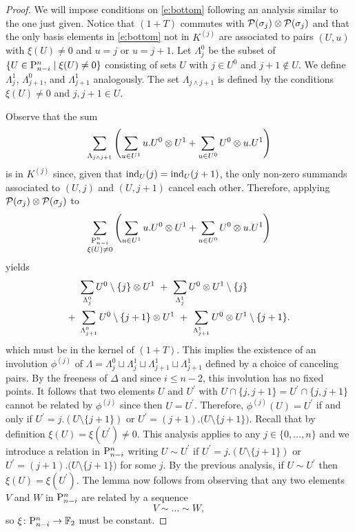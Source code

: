 \begin{proof}
	We will impose conditions on \eqref{e:bottom} following an analysis similar to the one just given.
	Notice that $(1+T)$ commutes with $\cP(\sigma_j) \ot \cP(\sigma_j)$ and that the only basis elements in \eqref{e:bottom} not in $K^{(j)}$ are associated to pairs $(U, u)$ with $\xi(U) \neq 0$ and $u = j$ or $ u = j+1$.
	Let $\Lambda_{j}^0$ be the subset of $\{U \in \P_{n-i}^n \mid \xi(U) \neq 0\}$ consisting of sets $U$ with $j \in U^0$ and $j+1 \notin U$.
	We define $\Lambda_{j}^1$, $\Lambda_{j+1}^0$, and $\Lambda_{j+1}^1$ analogously.
	The set $\Lambda_{j \wedge j+1}$ is defined by the conditions $\xi(U) \neq 0$ and $j,j+1 \in U$.

	Observe that the sum
	\[
	\sum_{\Lambda_{j \wedge j+1}} \left( \sum_{u \in U^1} {u.U^0} \ot {U^1} +
	\sum_{u \in U^0} {U^0} \ot {u.U^1} \right)
	\]
	is in $K^{(j)}$ since, given that $\ind_U(j) = \ind_U(j+1)$, the only non-zero summands associated to $(U,j)$ and $(U,j+1)$ cancel each other.
	Therefore, applying $\cP(\sigma_j) \ot \cP(\sigma_j)$ to
	\[
	\sum_{\substack{\P_{n-i}^n \\ \xi(U) \neq 0}} \left(\sum_{u \in U^1} {u.U^0} \ot {U^1} +
	\sum_{u \in U^0} {U^0} \ot {u.U^1} \right)
	\]
	yields
	\begin{align*}
	&\sum_{\Lambda_{j}^0} U^0 \setminus \{j\} \ot {U^1} \ + \
	\sum_{\Lambda_{j}^1} U^0 \ot {U^1} \setminus \{j\} \\ + \
	&\sum_{\Lambda_{j+1}^0} U^0 \setminus \{j+1\} \ot {U^1} \ + \
	\sum_{\Lambda_{j+1}^1} U^0 \ot {U^1} \setminus \{j+1\}.
	\end{align*}
	which must be in the kernel of $(1+T)$.
	This implies the existence of an involution $\phi^{(j)}$ of $\Lambda = \Lambda^0_{j} \sqcup \Lambda^1_{j} \sqcup \Lambda^1_{j+1} \sqcup \Lambda^1_{j+1}$ defined by a choice of canceling pairs.
	By the freeness of $\Delta$ and since $i \leq n-2$, this involution has no fixed points.
	It follows that two elements $U$ and $U^\prime$ with $U \cap \{j, j+1\} = U^\prime \cap \{j, j+1\}$ cannot be related by $\phi^{(j)}$ since then $U = U^\prime$.
	Therefore, $\phi^{(j)}(U) = U^\prime$ if and only if $U^\prime = j.(U \setminus \{j+1\})$ or $U^\prime = (j+1).\big( U \setminus \{j+1\} \big)$.
	Recall that by definition $\xi(U) = \xi(U^\prime) \neq 0$.
	This analysis applies to any $j \in \{0, \dots, n\}$ and we introduce a relation in $\P_{n-i}^n$ writing $U \sim U^\prime$ if $U^\prime = j.(U \setminus \{j+1\})$ or $U^\prime = (j+1).\big( U \setminus \{j+1\} \big)$ for some $j$.
	By the previous analysis, if $U \sim U^\prime$ then $\xi(U) = \xi(U^\prime)$.
	The lemma now follows from observing that any two elements $V$ and $W$ in $\P_{n-i}^n$ are related by a sequence
	\[
	V \sim \dots \sim W,
	\]
	so $\xi \colon \P_{n-i}^n \to \F$ must be constant.
\end{proof}
\fi

